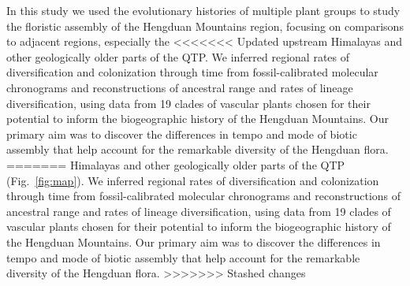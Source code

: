 


In this study we used the evolutionary histories of multiple plant
groups to study the floristic assembly of the Hengduan Mountains
region, focusing on comparisons to adjacent regions, especially the
<<<<<<< Updated upstream
Himalayas and other geologically older parts of the QTP. We inferred
regional rates of diversification and colonization through time from
fossil-calibrated molecular chronograms and reconstructions of
ancestral range and rates of lineage diversification, using data from
19 clades of vascular plants chosen for their potential to inform the
biogeographic history of the Hengduan Mountains. Our primary aim was
to discover the differences in tempo and mode of biotic assembly that
help account for the remarkable diversity of the Hengduan flora.
=======
Himalayas and other geologically older parts of the QTP
(Fig.~\ref{fig:map}). We inferred regional rates of diversification
and colonization through time from fossil-calibrated molecular
chronograms and reconstructions of ancestral range and rates of
lineage diversification, using data from 19 clades of vascular plants
chosen for their potential to inform the biogeographic history of the
Hengduan Mountains. Our primary aim was to discover the differences in
tempo and mode of biotic assembly that help account for the remarkable
diversity of the Hengduan flora.
>>>>>>> Stashed changes


